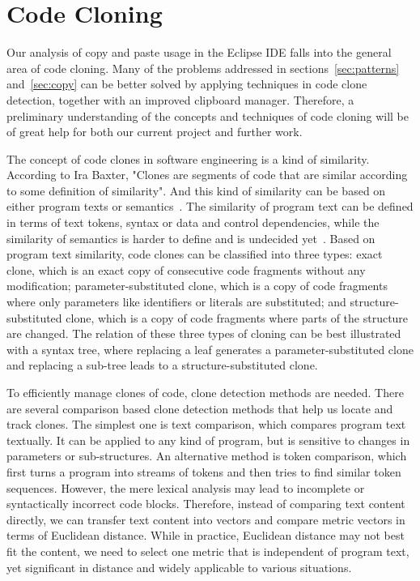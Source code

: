 \documentclass{acm_proc_article-sp}
\begin{document}
\section{Code Cloning}\label{sec:clones}

Our analysis of copy and paste usage in the Eclipse IDE falls into the general area of code cloning. Many of the problems addressed in sections~\ref{sec:patterns} and~\ref{sec:copy} can be better solved by applying techniques in code clone detection, together with an improved clipboard manager. Therefore, a preliminary understanding of the concepts and techniques of code cloning will be of great help for both our current project and further work. 

The concept of code clones in software engineering is a kind of similarity. According to Ira Baxter, "Clones are segments of code that are similar according to some definition of similarity". And this kind of similarity can be based on either program texts or semantics~\cite{frontiers}. The similarity of program text can be defined in terms of text tokens, syntax or data and control dependencies, while the similarity of semantics is harder to define and is undecided yet~\cite{frontiers}. Based on program text similarity, code clones can be classified into three types: exact clone, which is an exact copy of consecutive code fragments without any modification; parameter-substituted clone, which is a copy of code fragments where only parameters like identifiers or literals are substituted; and structure-substituted clone, which is a copy of code fragments where parts of the structure are changed. The relation of these three types of cloning can be best illustrated with a syntax tree, where replacing a leaf generates a parameter-substituted clone and replacing a sub-tree leads to a structure-substituted clone. 

To efficiently manage clones of code, clone detection methods are needed. There are several comparison based clone detection methods that help us locate and track clones. The simplest one is text comparison, which compares program text textually. It can be applied to any kind of program, but is sensitive to changes in parameters or sub-structures. An alternative method is token comparison, which first turns a program into streams of tokens and then tries to find similar token sequences. However, the mere lexical analysis may lead to incomplete or syntactically incorrect code blocks. Therefore, instead of comparing text content directly, we can transfer text content into vectors and compare metric vectors in terms of Euclidean distance. While in practice, Euclidean distance may not best fit the content, we need to select one metric that is independent of program text, yet significant in distance and widely applicable to various situations. 
\end{document}
